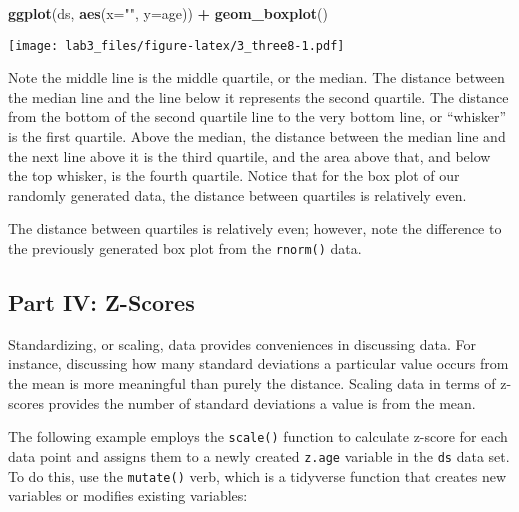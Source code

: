 \documentclass[]{article}
\newenvironment{Shaded}{\begin{snugshade}}{\end{snugshade}}
\newcommand{\KeywordTok}[1]{\textcolor[rgb]{0.13,0.29,0.53}{\textbf{#1}}}
\newcommand{\DataTypeTok}[1]{\textcolor[rgb]{0.13,0.29,0.53}{#1}}
\newcommand{\StringTok}[1]{\textcolor[rgb]{0.31,0.60,0.02}{#1}}
\newcommand{\OperatorTok}[1]{\textcolor[rgb]{0.81,0.36,0.00}{\textbf{#1}}}
\newcommand{\NormalTok}[1]{#1}
\begin{document}
\begin{Shaded}
\begin{Highlighting}[]
\KeywordTok{ggplot}\NormalTok{(ds, }\KeywordTok{aes}\NormalTok{(}\DataTypeTok{x=}\StringTok{""}\NormalTok{, }\DataTypeTok{y=}\NormalTok{age)) }\OperatorTok{+}
\StringTok{  }\KeywordTok{geom_boxplot}\NormalTok{()}
\end{Highlighting}
\end{Shaded}

\texttt{[image: lab3\_files/figure-latex/3\_three8-1.pdf]}

Note the middle line is the middle quartile, or the median. The distance
between the median line and the line below it represents the second
quartile. The distance from the bottom of the second quartile line to
the very bottom line, or ``whisker'' is the first quartile. Above the
median, the distance between the median line and the next line above it
is the third quartile, and the area above that, and below the top
whisker, is the fourth quartile. Notice that for the box plot of our
randomly generated data, the distance between quartiles is relatively
even.

The distance between quartiles is relatively even; however, note the
difference to the previously generated box plot from the
\texttt{rnorm()} data.

\subsection{Part IV: Z-Scores}\label{part-iv-z-scores}

Standardizing, or scaling, data provides conveniences in discussing
data. For instance, discussing how many standard deviations a particular
value occurs from the mean is more meaningful than purely the distance.
Scaling data in terms of z-scores provides the number of standard
deviations a value is from the mean.

The following example employs the \texttt{scale()} function to calculate
z-score for each data point and assigns them to a newly created
\texttt{z.age} variable in the \texttt{ds} data set. To do this, use the
\texttt{mutate()} verb, which is a tidyverse function that creates new
variables or modifies existing variables:

\begin{Shaded}
\end{Shaded}
\end{document}
